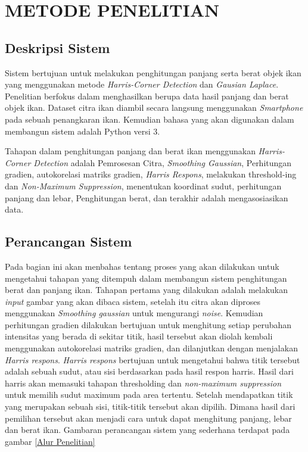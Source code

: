 
\chapter{METODE PENELITIAN}

\section{Deskripsi Sistem}
    Sistem bertujuan untuk melakukan penghitungan panjang serta berat objek ikan yang menggunakan
metode \emph{Harris-Corner Detection} dan \emph{Gausian Laplace}. Penelitian berfokus dalam menghasilkan berupa
data hasil panjang dan berat objek ikan. Dataset citra ikan diambil secara langsung menggunakan \emph{Smartphone} pada sebuah
penangkaran ikan. Kemudian bahasa yang akan digunakan dalam membangun sistem adalah Python versi 3.

Tahapan dalam penghitungan panjang dan berat ikan menggunakan \emph{Harris-Corner Detection} adalah Pemrosesan Citra,
\emph{Smoothing Gaussian}, Perhitungan gradien, autokorelasi matriks gradien, \emph{Harris Respons}, melakukan threshold-ing dan \emph{Non-Maximum Suppression}, menentukan koordinat sudut, perhitungan panjang dan lebar, Penghitungan berat,
dan terakhir adalah mengasosiasikan data.

\section{Perancangan Sistem}
    Pada bagian ini akan menbahas tentang proses yang akan dilakukan untuk mengetahui tahapan yang ditempuh
dalam membangun sistem penghitungan berat dan panjang ikan. Tahapan pertama yang dilakukan adalah melakukan \emph{input} gambar
yang akan dibaca sistem, setelah itu citra akan diproses menggunakan \emph{Smoothing gaussian} untuk mengurangi \emph{noise}. Kemudian perhitungan gradien dilakukan bertujuan untuk menghitung setiap perubahan intensitas yang berada di sekitar titik, 
hasil tersebut akan diolah kembali menggunakan autokorelasi matriks gradien, dan dilanjutkan dengan menjalakan \emph{Harris respons}. \emph{Harris respons} bertujuan untuk mengetahui bahwa titik tersebut adalah sebuah sudut, atau sisi berdasarkan pada hasil respon harris. 
Hasil dari harris akan memasuki tahapan thresholding dan \emph{non-maximum suppression} untuk memilih sudut maximum pada area tertentu. Setelah mendapatkan titik yang merupakan sebuah sisi, titik-titik tersebut akan dipilih. 
Dimana hasil dari pemilihan tersebut akan menjadi cara untuk dapat menghitung panjang, lebar dan berat ikan. Gambaran perancangan sistem yang sederhana terdapat pada gambar \ref*{Alur Penelitian}

